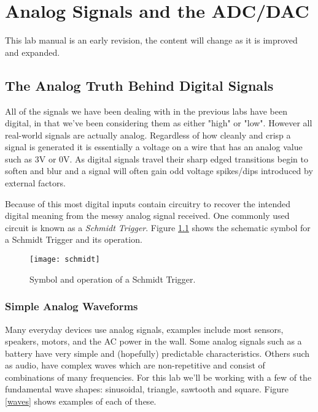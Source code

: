 \documentclass[11pt,fleqn]{book} %
\begin{document}
	
\chapter{Analog Signals and the ADC/DAC}

\begin{warning}
    This lab manual is an early revision, the content will change as it is improved and expanded. 
\end{warning}

\section{The Analog Truth Behind Digital Signals}
All of the signals we have been dealing with in the previous labs have been digital, in that we've been considering them as either "high" or "low". However all real-world signals are actually analog. Regardless of how cleanly and crisp a signal is generated it is essentially a voltage on a wire that has an analog value such as 3V or 0V. As digital signals travel their sharp edged transitions begin to soften and blur and a signal will often gain odd voltage spikes/dips introduced by external factors. 

Because of this most digital inputs contain circuitry to recover the intended digital meaning from the messy analog signal received. One commonly used circuit is known as a \textit{Schmidt Trigger}. Figure \ref{schmidt} shows the schematic symbol for a Schmidt Trigger and its operation. 

\begin{figure}[]
    \centering\texttt{[image: schmidt]}
    \caption{Symbol and operation of a Schmidt Trigger.}
    \label{schmidt}
\end{figure}

\subsection{Simple Analog Waveforms}
Many everyday devices use analog signals, examples include most sensors, speakers, motors, and the AC power in the wall. Some analog signals such as a battery have very simple and (hopefully) predictable characteristics. Others such as audio, have complex waves which are non-repetitive and consist of combinations of many frequencies. For this lab we'll be working with a few of the fundamental wave shapes: sinusoidal, triangle, sawtooth and square. Figure \ref{waves} shows examples of each of these. 
\end{document}
